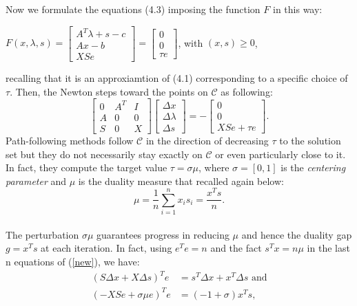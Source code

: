 \documentclass[a4paper,10 pt,titlepage,twoside]{report}
\theoremstyle{plain}
\theoremstyle{definition}
\theoremstyle{remark}
\begin{document}
 Now we formulate the equations (4.3) imposing the function $\mathit{F}$ in this way:
 \begin{center}
 	$\mathit{F}(x,\lambda,s)= \begin{bmatrix}
 	A^{T}\lambda+s-c \\Ax-b \\XSe
 	\end{bmatrix}=\begin{bmatrix} 0\\0\\ \tau e \end{bmatrix}$, with $(x,s)\geq0$,
 \end{center}
recalling that it is an approxiamtion of (4.1) corresponding
to a specific choice of $\tau$. Then, the Newton steps toward the points on $\mathcal{C}$ as following:
 \begin{equation}\label{new}\tag{4.5}
 \begin{bmatrix}
 0&A^{T}&I \\A&0&0\\S&0&X
 \end{bmatrix}\begin{bmatrix}
 \Delta x\\\Delta\lambda \\\Delta s
 \end{bmatrix}=-\begin{bmatrix}
 0\\0\\XSe + \tau e
 \end{bmatrix}.
 \end{equation}
 Path-following methods follow $\mathcal{C}$ in the direction of decreasing $\tau$ to the solution set but they do not necessarily stay exactly on $\mathcal{C}$ or even particularly close to it. In fact, they compute the target value $\tau = \sigma \mu$, where $\sigma = [0,1]$ is the \textit{centering parameter} and $\mu$ is the duality measure that recalled again below:
 \begin{equation}\label{eq:dm}\tag{4.6}
 \mu = \frac{1}{n}\sum_{i=1}^{n} x_{i}s_{i} = \frac{x^{T}s}{n}.
 \end{equation}\\
 The perturbation $\sigma\mu$ guarantees progress in reducing $\mu$ and hence the duality gap $g = x^{T}s$ at each iteration.
In fact, using $e^{T}e= n$ and the fact $s^{T}x=n\mu$ in the last n equations of (\ref{new}), we have:
 \begin{align*}
 (S\Delta x + X\Delta s)^{T}e &= s^{T}\Delta x + x^{T}\Delta s \text{ and}\\
  (- XSe + \sigma \mu e)^{T}e &= (-1 + \sigma)x^{T}s,
 \end{align*}
\end{document}
